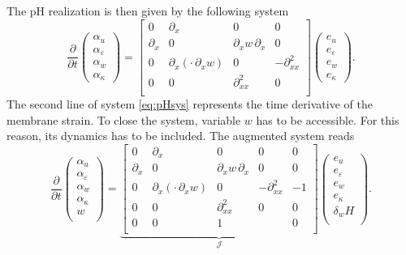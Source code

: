 \documentclass{ifacconf}
\begin{document}
The pH realization is then given by the following system
\begin{equation}\label{eq:pHsys}
	\frac{\partial}{\partial t}
	\begin{pmatrix}
		\alpha_u \\
		\alpha_\varepsilon \\
		\alpha_w \\
		\alpha_\kappa
	\end{pmatrix} = 
	\begin{bmatrix}
		0 & \partial_x & 0 & 0 \\
		\partial_x & 0 & \partial_x w \, \partial_x & 0 \\
		0 & \partial_x(\cdot \, \partial_x w) & 0 & -\partial_{xx}^2 \\
		0 & 0 & \partial_{xx}^2 & 0 \\ 
	\end{bmatrix}
	\begin{pmatrix}
		e_u \\
		e_\varepsilon \\
		e_w \\
		e_\kappa 
	\end{pmatrix}.
\end{equation}
The second line of system \eqref{eq:pHsys} represents the time derivative of the membrane strain. To close the system, variable $w$ has to be accessible. For this reason, its dynamics has to be included. The augmented system reads
\begin{equation}\label{eq:pHsys_aug}
	\frac{\partial}{\partial t}
	\begin{pmatrix}
		\alpha_u \\
		\alpha_\varepsilon \\
		\alpha_w \\
		\alpha_\kappa \\
		w \\
	\end{pmatrix} = 
	\underbrace{\begin{bmatrix}
			0 & \partial_x & 0 & 0 & 0\\
			\partial_x & 0 & \partial_x w \, \partial_x & 0 & 0 \\
			0 & \partial_x(\cdot \, \partial_x w) & 0 & -\partial_{xx}^2 & -1 \\
			0 & 0 & \partial_{xx}^2 & 0 & 0 \\ 
			0 & 0 & 1 &  & 0 \\
	\end{bmatrix}}_{\mathcal{J}}
	\begin{pmatrix}
		e_u \\
		e_\varepsilon \\
		e_w \\
		e_\kappa \\
		\delta_w H  \\
	\end{pmatrix}.
\end{equation}
\end{document}
